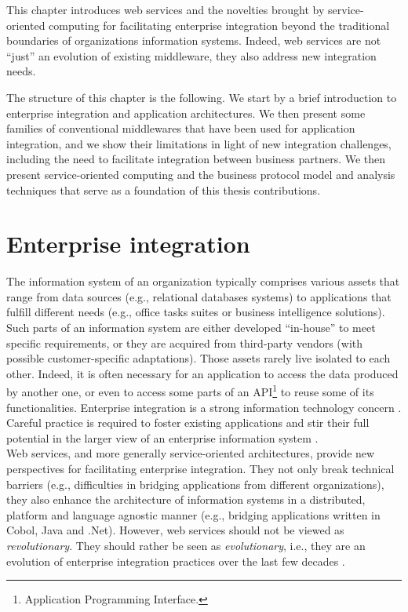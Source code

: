 
This chapter introduces web services and the novelties brought by service-oriented computing for facilitating enterprise integration beyond the traditional boundaries of organizations information systems. Indeed, web services are not ``just'' an evolution of existing middleware, they also address new integration needs.

The structure of this chapter is the following. We start by a brief introduction to enterprise integration and application architectures. We then present some families of conventional middlewares that have been used for application integration, and we show their limitations in light of new integration challenges, including the need to facilitate integration between business partners.  We then present service-oriented computing and the business protocol model and analysis techniques that serve as a foundation of this thesis contributions.


\section{Enterprise integration}


The information system of an organization typically comprises various assets that range from data sources (e.g., relational databases systems) to applications that fulfill different needs (e.g., office tasks suites or business intelligence solutions). Such parts of an information system are either developed ``in-house'' to meet specific requirements, or they are acquired from third-party vendors (with possible customer-specific adaptations). Those assets rarely live isolated to each other. Indeed, it is often necessary for an application to access the data produced by another one, or even to access some parts of an API\footnote{Application Programming Interface.} to reuse some of its functionalities. Enterprise integration is a strong information technology concern \cite{HW03}. Careful practice is required to foster existing applications and stir their full potential in the larger view of an enterprise information system \cite{EAA02}.\\

Web services, and more generally service-oriented architectures, provide new perspectives for facilitating enterprise integration. They not only break technical barriers (e.g., difficulties in bridging applications from different organizations), they also enhance the architecture of information systems in a distributed, platform and language agnostic manner (e.g., bridging applications written in Cobol, Java and .Net). However, web services should not be viewed as \emph{revolutionary}. They should rather be seen as \emph{evolutionary}, i.e., they are an evolution of enterprise integration practices over the last few decades \cite{Alonso04}.\\


